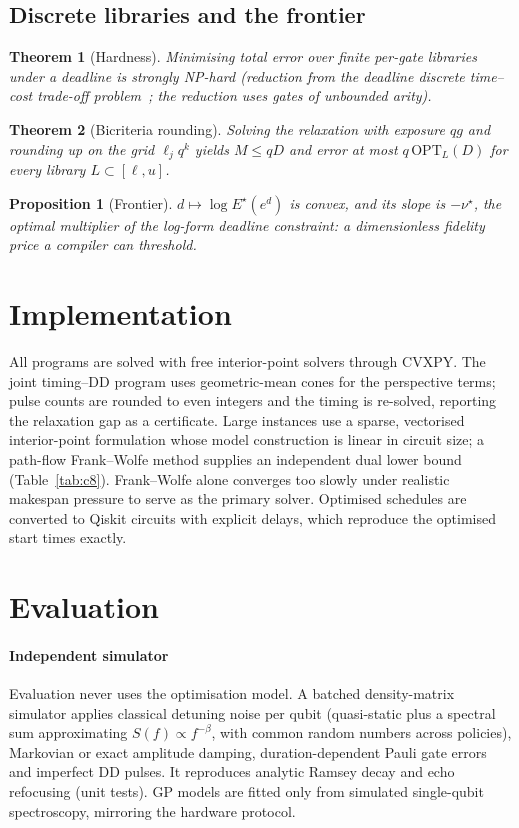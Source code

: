 \documentclass[10pt,journal]{IEEEtran}
\newtheorem{theorem}{Theorem}
\newtheorem{proposition}{Proposition}
\theoremstyle{remark}
\begin{document}
\subsection{Discrete libraries and the frontier}
\begin{theorem}[Hardness]\label{thm:hard}
Minimising total error over finite per-gate libraries under a deadline is strongly NP-hard (reduction from the
deadline discrete time--cost trade-off problem~\cite{de1997}; the reduction uses gates of unbounded arity).
\end{theorem}
\begin{theorem}[Bicriteria rounding]\label{thm:bicriteria}
Solving the relaxation with exposure $qg$ and rounding up on the grid $\ell_jq^k$ yields $M\le qD$ and error at
most $q\,\mathrm{OPT}_L(D)$ for every library $L\subset[\ell,u]$.
\end{theorem}
\begin{proposition}[Frontier]\label{prop:frontier}
$d\mapsto\log E^\star(e^d)$ is convex, and its slope is $-\nu^\star$, the optimal multiplier of the log-form
deadline constraint: a dimensionless fidelity price a compiler can threshold.
\end{proposition}

\section{Implementation}
All programs are solved with free interior-point solvers through CVXPY. The joint timing--DD program uses
geometric-mean cones for the perspective terms; pulse counts are rounded to even integers and the timing is
re-solved, reporting the relaxation gap as a certificate. Large instances use a sparse, vectorised interior-point formulation whose model construction is linear in
circuit size; a path-flow Frank--Wolfe method supplies an independent dual lower bound
(Table~\ref{tab:c8}). Frank--Wolfe alone converges too slowly under realistic makespan pressure to serve as
the primary solver. Optimised schedules are converted to Qiskit circuits with explicit delays, which reproduce
the optimised start times exactly.

\section{Evaluation}\label{sec:eval}
\paragraph*{Independent simulator}
Evaluation never uses the optimisation model. A batched density-matrix simulator applies classical detuning
noise per qubit (quasi-static plus a spectral sum approximating $S(f)\propto f^{-\beta}$, with common random
numbers across policies), Markovian or exact amplitude damping, duration-dependent Pauli gate errors and
imperfect DD pulses. It reproduces analytic Ramsey decay and echo refocusing (unit tests). GP models are fitted
only from simulated single-qubit spectroscopy, mirroring the hardware protocol.
\end{document}
